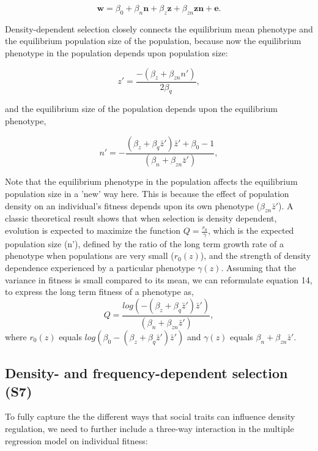 \documentclass{article}
\begin{document}
\begin{equation} \label{eq: DDRS}
\mathbf{w}=\beta_{0} +\beta_{n} \mathbf{n} + \beta_{z} \mathbf{z}+  \beta_{zn} \mathbf{zn}  +  \mathbf{e}.
\end{equation}

\noindent Density-dependent selection closely connects the equilibrium mean phenotype and the equilibrium population size of the population, because now the equilibrium phenotype in the population depends upon population size:

\begin{equation} 
z'=\frac{-(\beta_{z}+\beta_{zn}n')}{2\beta_{q}},
\end{equation} 

and the equilibrium size of the population depends upon the equilibrium phenotype,

\begin{equation}
		n' = -\frac{(\beta_{z}  +  \beta_{q}\bar{z}')\bar{z}'+\beta_{0} -1}{(\beta_{n} +  \beta_{zn} \bar{z}')},
\end{equation}

\noindent Note that the equilibrium phenotype in the population affects the equilibrium population size in a 'new' way here. This is because the effect of population density on an individual's fitness depends upon its own phenotype ($\beta_{zn} \bar{z}'$). A classic theoretical result \citep{MacArthur1962, Engen2013} shows that when selection is density dependent, evolution is expected to maximize the function $Q=\frac{r_0}{\gamma}$, which is the expected population size (n'), defined by the ratio of the long term growth rate of a phenotype when populations are very small ($r_0(z)$), and the strength of density dependence experienced by a particular phenotype $\gamma(z)$.  Assuming that the variance in fitness is small compared to its mean, we can reformulate equation 14, to express the long term fitness of a phenotype as,  $$Q=\frac{log(-(\beta_{z}  +  \beta_{q}\bar{z}')\bar{z}')}{(\beta_{n} +  \beta_{zn} \bar{z}')},$$ where  $r_0(z)$ equals $log(\beta_{0}-(\beta_{z}  +  \beta_{q}\bar{z}')\bar{z}')$ and $\gamma(z)$ equals $\beta_{n} +  \beta_{zn} \bar{z}'$.

\subsection{Density- and frequency-dependent selection (S7)}

To fully capture the the different ways that social traits can influence density regulation, we need to further include a three-way interaction in the multiple regression model on individual fitness:
\end{document}
